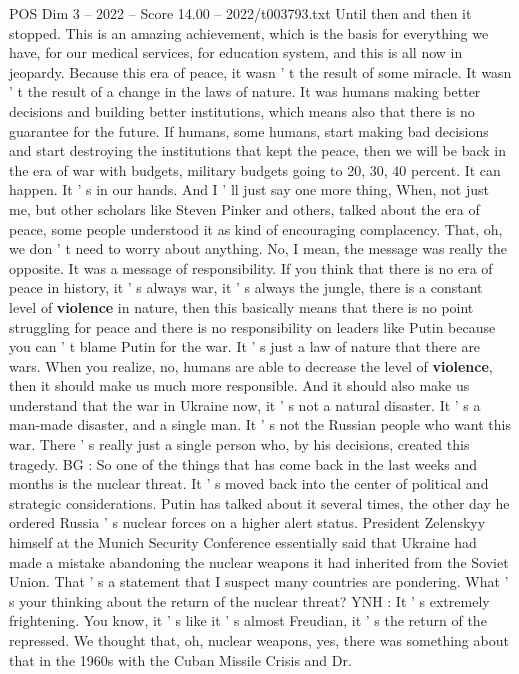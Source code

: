 \begin{textsample}{POS Dim 3 – 2022 – Score 14.00 – 2022/t003793.txt}
Until then and then it stopped.
This is an amazing achievement, which is the basis for everything we have, for our medical services, for education system, and this is all now in jeopardy.
Because this era of peace, it wasn ' t the result of some miracle.
It wasn ' t the result of a change in the laws of nature.
It was humans making better decisions and building better institutions, which means also that there is no guarantee for the future.
If humans, some humans, start making bad decisions and start destroying the institutions that kept the peace, then we will be back in the era of war with budgets, military budgets going to 20, 30, 40 percent.
It can happen.
It ' s in our hands.
And I ' ll just say one more thing, When, not just me, but other scholars like Steven Pinker and others, talked about the era of peace, some people understood it as kind of encouraging complacency.
That, oh, we don ' t need to worry about anything.
No, I mean, the message was really the opposite.
It was a message of responsibility.
If you think that there is no era of peace in history, it ' s always war, it ' s always the jungle, there is a constant level of \textbf{violence} in nature, then this basically means that there is no point struggling for peace and there is no responsibility on leaders like Putin because you can ' t blame Putin for the war.
It ' s just a law of nature that there are wars.
When you realize, no, humans are able to decrease the level of \textbf{violence}, then it should make us much more responsible.
And it should also make us understand that the war in Ukraine now, it ' s not a natural disaster.
It ' s a man-made disaster, and a single man.
It ' s not the Russian people who want this war.
There ' s really just a single person who, by his decisions, created this tragedy.
BG : So one of the things that has come back in the last weeks and months is the nuclear threat.
It ' s moved back into the center of political and strategic considerations.
Putin has talked about it several times, the other day he ordered Russia ' s nuclear forces on a higher alert status.
President Zelenskyy himself at the Munich Security Conference essentially said that Ukraine had made a mistake abandoning the nuclear weapons it had inherited from the Soviet Union.
That ' s a statement that I suspect many countries are pondering.
What ' s your thinking about the return of the nuclear threat?
YNH : It ' s extremely frightening.
You know, it ' s like it ' s almost Freudian, it ' s the return of the repressed.
We thought that, oh, nuclear weapons, yes, there was something about that in the 1960s with the Cuban Missile Crisis and Dr.

\end{textsample}
